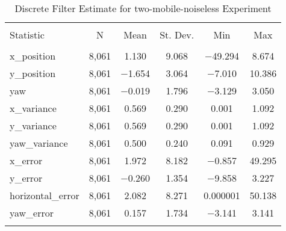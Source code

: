 
\begin{table}[h] \centering 
  \caption{Discrete Filter Estimate for two-mobile-noiseless Experiment} 
  \label{tab:two_mobile_noiseless_discrete_summary} 
\begin{tabular}{@{\extracolsep{5pt}}lccccc} 
\\[-1.8ex]\hline 
\hline \\[-1.8ex] 
Statistic & \multicolumn{1}{c}{N} & \multicolumn{1}{c}{Mean} & \multicolumn{1}{c}{St. Dev.} & \multicolumn{1}{c}{Min} & \multicolumn{1}{c}{Max} \\ 
\hline \\[-1.8ex] 
x\_position & 8,061 & 1.130 & 9.068 & $-$49.294 & 8.674 \\ 
y\_position & 8,061 & $-$1.654 & 3.064 & $-$7.010 & 10.386 \\ 
yaw & 8,061 & $-$0.019 & 1.796 & $-$3.129 & 3.050 \\ 
x\_variance & 8,061 & 0.569 & 0.290 & 0.001 & 1.092 \\ 
y\_variance & 8,061 & 0.569 & 0.290 & 0.001 & 1.092 \\ 
yaw\_variance & 8,061 & 0.500 & 0.240 & 0.091 & 0.929 \\ 
x\_error & 8,061 & 1.972 & 8.182 & $-$0.857 & 49.295 \\ 
y\_error & 8,061 & $-$0.260 & 1.354 & $-$9.858 & 3.227 \\ 
horizontal\_error & 8,061 & 2.082 & 8.271 & 0.000001 & 50.138 \\ 
yaw\_error & 8,061 & 0.157 & 1.734 & $-$3.141 & 3.141 \\ 
\hline \\[-1.8ex] 
\end{tabular} 
\end{table} 
